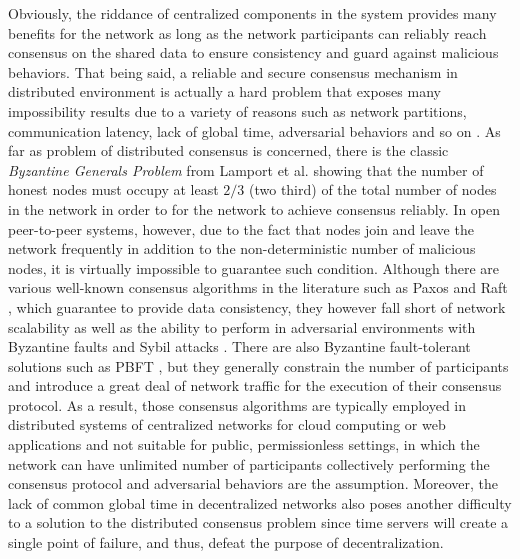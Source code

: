 Obviously, the riddance of centralized components in the system provides many benefits for the network as long as the network participants can reliably reach consensus on the shared data to ensure consistency and guard against malicious behaviors.
That being said, a reliable and secure consensus mechanism in distributed environment is actually a hard problem that exposes many impossibility results due to a variety of reasons such as network partitions, communication latency, lack of global time, adversarial behaviors and so on \cite{narayanan2016bitcoin}. As far as problem of distributed consensus is concerned, there is the classic \textit{Byzantine Generals Problem} from Lamport et al. \cite{lamport1982byzantine} showing that the number of honest nodes must occupy at least $2/3$ (two third) of the total number of nodes in the network in order to for the network to achieve consensus reliably. In open peer-to-peer systems, however, due to the fact that nodes join and leave the network frequently in addition to the non-deterministic number of malicious nodes, it is virtually impossible to guarantee such condition. Although there are various well-known consensus algorithms in the literature such as Paxos \cite{lamport2001paxos} and Raft \cite{ongaro2015raft}, which guarantee to provide data consistency, they however fall short of network scalability as well as the ability to perform in adversarial environments with Byzantine faults \cite{lamport1982byzantine} and Sybil attacks \cite{douceur2002sybil}. There are also Byzantine fault-tolerant solutions such as PBFT \cite{castro2002practical}, but they generally constrain the number of participants and introduce a great deal of network traffic for the execution of their consensus protocol. As a result, those consensus algorithms are typically employed in distributed systems of centralized networks for cloud computing or web applications \cite{ailijiang2016consensus} and not suitable for public, permissionless settings, in which the network can have unlimited number of participants collectively performing the consensus protocol and adversarial behaviors are the assumption. Moreover, the lack of common global time in decentralized networks also poses another difficulty to a solution to the distributed consensus problem since time servers will create a single point of failure, and thus, defeat the purpose of decentralization.

